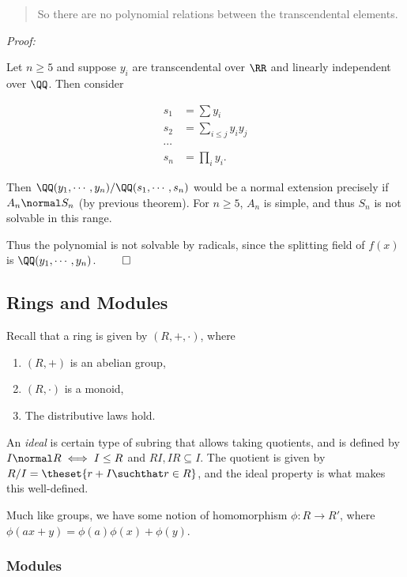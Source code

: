 \begin{quote}
So there are no polynomial relations between the transcendental
elements.
\end{quote}

\emph{Proof:}

Let \(n\geq 5\) and suppose \(y_i\) are transcendental over \(\RR\) and
linearly independent over \(\QQ\). Then consider

\begin{align*}
s_1 &= \sum y_i \\
s_2 &= \sum_{i\leq j} y_i y_j \\
\cdots \\
s_n &= \prod_i y_i
.\end{align*}

Then \(\QQ(y_1, \cdots, y_n)/ \QQ(s_1, \cdots, s_n)\) would be a normal
extension precisely if \(A_n \normal S_n\) (by previous theorem). For
\(n\geq 5\), \(A_n\) is simple, and thus \(S_n\) is not solvable in this
range.

Thus the polynomial is not solvable by radicals, since the splitting
field of \(f(x)\) is \(\QQ(y_1, \cdots, y_n)\). \(\qed\)

\hypertarget{rings-and-modules}{%
\subsection{Rings and Modules}\label{rings-and-modules}}

Recall that a ring is given by \((R, +, \cdot)\), where

\begin{enumerate}
\def\labelenumi{\arabic{enumi}.}
\tightlist
\item
  \((R, +)\) is an abelian group,
\item
  \((R, \cdot)\) is a monoid,
\item
  The distributive laws hold.
\end{enumerate}

An \emph{ideal} is certain type of subring that allows taking quotients,
and is defined by \(I \normal R \iff I\leq R\) and
\(RI, IR \subseteq I\). The quotient is given by
\(R/I = \theset{r + I \suchthat r\in R}\), and the ideal property is
what makes this well-defined.

Much like groups, we have some notion of homomorphism \(\phi: R\to R'\),
where \(\phi(ax+y) = \phi(a)\phi(x) + \phi(y)\).

\hypertarget{modules}{%
\subsubsection{Modules}\label{modules}}

